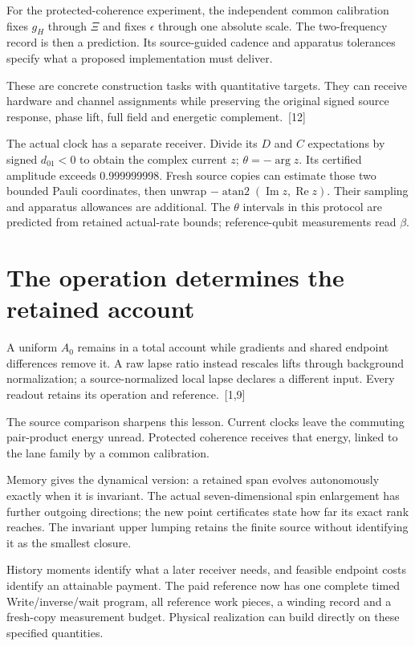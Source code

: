 \documentclass[10pt,twocolumn,letterpaper]{article}
\begin{document}
For the protected-coherence experiment, the independent common calibration fixes $g_H$ through $\Xi$ and fixes $\epsilon$ through one absolute scale. The two-frequency record is then a prediction. Its source-guided cadence and apparatus tolerances specify what a proposed implementation must deliver.

These are concrete construction tasks with quantitative targets. They can receive hardware and channel assignments while preserving the original signed source response, phase lift, full field and energetic complement.~[12]

The actual clock has a separate receiver. Divide its $D$ and $C$ expectations by signed $d_{01}<0$ to obtain the complex current $z$; $\theta=-\arg z$. Its certified amplitude exceeds 0.999999998. Fresh source copies can estimate those two bounded Pauli coordinates, then unwrap $-\operatorname{atan2}(\operatorname{Im}z,\operatorname{Re}z)$. Their sampling and apparatus allowances are additional. The $\theta$ intervals in this protocol are predicted from retained actual-rate bounds; reference-qubit measurements read $\beta$.


\section{The operation determines the retained account}
A uniform $A_0$ remains in a total account while gradients and shared endpoint differences remove it. A raw lapse ratio instead rescales lifts through background normalization; a source-normalized local lapse declares a different input. Every readout retains its operation and reference.~[1,9]

The source comparison sharpens this lesson. Current clocks leave the commuting pair-product energy unread. Protected coherence receives that energy, linked to the lane family by a common calibration.

Memory gives the dynamical version: a retained span evolves autonomously exactly when it is invariant. The actual seven-dimensional spin enlargement has further outgoing directions; the new point certificates state how far its exact rank reaches. The invariant upper lumping retains the finite source without identifying it as the smallest closure.

History moments identify what a later receiver needs, and feasible endpoint costs identify an attainable payment. The paid reference now has one complete timed Write/inverse/wait program, all reference work pieces, a winding record and a fresh-copy measurement budget. Physical realization can build directly on these specified quantities.
\end{document}
